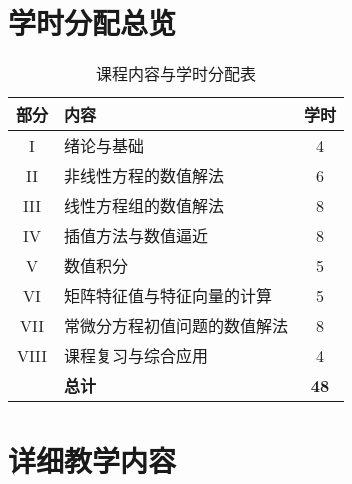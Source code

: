 \documentclass[12pt, a4paper]{article} %
\begin{document}
	
	
	\section{学时分配总览}
	\begin{table}[h!]
		\centering
		\caption{课程内容与学时分配表}
		\label{tab:schedule}
		\begin{tabular}{c l c}
			\toprule
			\textbf{部分} & \textbf{内容} & \textbf{学时} \\
			\midrule
			I & 绪论与基础 & 4 \\
			II & 非线性方程的数值解法 & 6 \\
			III & 线性方程组的数值解法 & 8 \\
			IV & 插值方法与数值逼近 & 8 \\
			V & 数值积分 & 5 \\
			VI & 矩阵特征值与特征向量的计算 & 5 \\
			VII & 常微分方程初值问题的数值解法 & 8 \\
			VIII & 课程复习与综合应用 & 4 \\
			\midrule
			& \textbf{总计} & \textbf{48} \\
			\bottomrule
		\end{tabular}
	\end{table}
	
	\section{详细教学内容}
	
\end{document}
